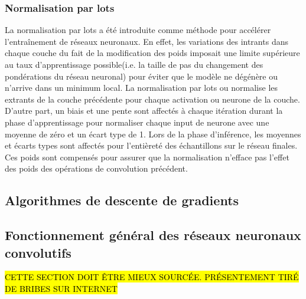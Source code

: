     \subsubsection{Normalisation par lots}
    La normalisation par lots \parencite{ioffe_batch_2015} a été introduite comme méthode pour accélérer l’entraînement de réseaux neuronaux. En effet, les variations des intrants dans chaque couche du fait de la modification des poids imposait une limite supérieure au taux d'apprentissage possible(i.e. la taille de pas du changement des pondérations du réseau neuronal) pour éviter que le modèle ne dégénère ou n'arrive dans un minimum local. La normalisation par lots ou  \fg{} normalise les extrants de la couche précédente pour chaque activation ou neurone de la couche. D'autre part, un biais et une pente sont affectés à chaque itération durant la phase d'apprentissage pour normaliser chaque input de neurone avec une moyenne de zéro et un écart type de 1. Lors de la phase d'inférence, les moyennes et écarts types sont affectés pour l'entièreté des échantillons sur le réseau finales. Ces poids sont compensés pour assurer que la normalisation n'efface pas l'effet des poids des opérations de convolution précédent. 
    \subsection{Algorithmes de descente de gradients} \label{ssec:grad_desc}

    \subsection{Fonctionnement général des réseaux neuronaux convolutifs}
    \hl{CETTE SECTION DOIT ÊTRE MIEUX SOURCÉE. PRÉSENTEMENT TIRÉ DE BRIBES SUR INTERNET}\par
